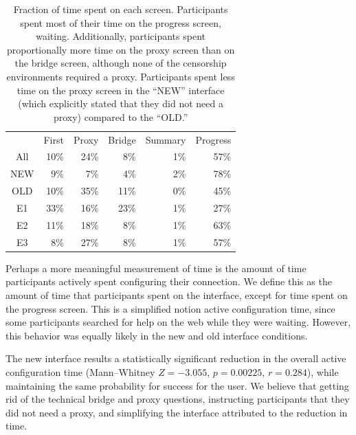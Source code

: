 \documentclass[USenglish,oneside,twocolumn]{article}
\begin{document}
\begin{table}
\centering
	\begin{tabular}{c r r r r r}
	 & First & Proxy & Bridge & Summary & Progress \\
	\noalign{\hrule}
	All &  10\% & 24\% & 8\% & 1\% & 57\% \\
	NEW & 9\% & 7\% & 4\% & 2\% &  78\% \\
	OLD & 10\% & 35\% & 11\% & 0\% & 45\% \\
	E1 & 33\% & 16\% & 23\% & 1\% & 27\% \\
	E2 & 11\% & 18\% & 8\% & 1\% & 63\% \\
	E3 & 8\% & 27\% & 8\% & 1\% & 57\% \\
	\end{tabular}
\caption{Fraction of time spent on each screen.
Participants spent most of their time on the progress screen, waiting.
Additionally, participants spent proportionally more time on the proxy screen than on the bridge screen,
although none of the censorship environments required a proxy.
Participants spent less time on the proxy screen
in the ``NEW'' interface (which explicitly stated that they did not need a proxy) compared to the ``OLD.''} 
\label{table:overall_time}
\end{table}

Perhaps a more meaningful measurement of time is the amount of time participants actively spent configuring their connection. We define this as the amount of time that participants spent on the interface, except for time spent on the progress screen. This is a simplified notion active configuration time, since some participants searched for help on the web while they were waiting. However, this behavior was equally likely in the new and old interface conditions.

The new interface results a statistically significant reduction in the overall active configuration time (Mann--Whitney $Z = -3.055$, $p = 0.00225$, $r= 0.284$), while maintaining the same probability for success for the user. We believe that getting rid of the technical bridge and proxy questions, instructing participants that they did not need a proxy, and simplifying the interface attributed to the reduction in time. 
\end{document}
